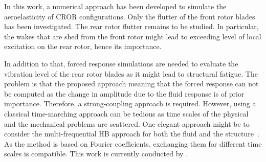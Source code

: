In this work, a numerical approach has been developed to
simulate the aeroelasticity of CROR configurations. Only the flutter of the
front rotor blades has been investigated. The rear rotor
flutter remains to be studied. In particular, the wakes that are
shed from the front rotor might lead to exceeding level of
local excitation on the rear rotor, hence its importance.

In addition to that, forced
response simulations are needed to evaluate the vibration
level of the rear rotor blades as it might lead
to structural fatigue.
The problem is that the
proposed approach  meaning
that the forced response can not be computed as the
change in amplitude due to the fluid response is of
prior importance. Therefore, a strong-coupling approach
is required. However, using a classical time-marching approach
can be tedious as time scales of the physical 
and the mechanical problems are scattered. One elegant approach might
be to consider the multi-frequential HB approach for both the
fluid and the structure~\cite{Salles2011}. 
As the method is based on Fourier coefficients,
exchanging them for different time scales is compatible.
This work is currently conducted by \citet{ThesisCadel}.
